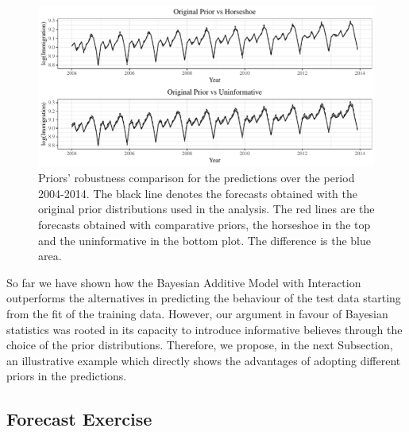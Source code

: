 \documentclass{article}\usepackage[]{graphicx}\usepackage[]{color}
\begin{document}
\begin{figure}[H]
\centering
\includegraphics[scale=0.7]{forecasts_comparison.pdf}
\caption{Priors' robustness comparison for the predictions over the period 2004-2014. The black line denotes the forecasts obtained with the original prior distributions used in the analysis. The red lines are the forecasts obtained with comparative priors, the horseshoe in the top and the uninformative in the bottom plot. The difference is the blue area.}
\label{fig:comparison}
\end{figure}

So far we have shown how the Bayesian Additive Model with Interaction outperforms the alternatives in predicting the behaviour of the test data starting from the fit of the training data. However, our argument in favour of Bayesian statistics was rooted in its capacity to introduce informative believes through the choice of the prior distributions. Therefore, we propose, in the next Subsection, an illustrative example which directly shows the advantages of adopting different priors in the predictions.

\subsection{Forecast Exercise}\label{forecast}
\end{document}

